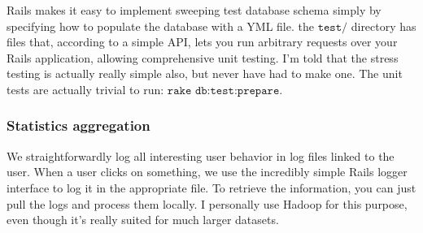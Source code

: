 \documentclass[11pt,a4paper]{article}
\begin{document}
Rails makes it easy to implement sweeping test database schema simply by specifying how to populate the database with a YML file. the $\texttt{test/}$ directory has files that, according to a simple API, lets you run arbitrary requests over your Rails application, allowing comprehensive unit testing. I'm told that the stress testing is actually really simple also, but never have had to make one. The unit tests are actually trivial to run: $\texttt{rake db:test:prepare}$.

\subsubsection{Statistics aggregation}

We straightforwardly log all interesting user behavior in log files linked to the user. When a user clicks on something, we use the incredibly simple Rails logger interface to log it in the appropriate file. To retrieve the information, you can just pull the logs and process them locally. I personally use Hadoop for this purpose, even though it's really suited for much larger datasets.
\end{document}
